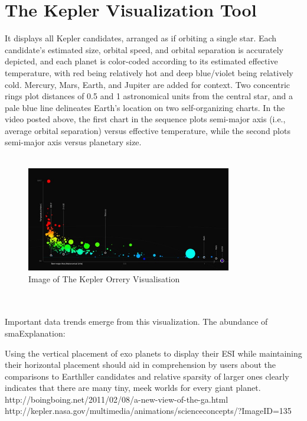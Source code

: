 \documentclass[11pt
              , a4paper
              , twoside
              , openright
              ]{report}
\begin{document}
\section{The Kepler Visualization Tool }
It displays all Kepler candidates, arranged as if orbiting a single star. Each candidate's estimated size, orbital speed, and orbital separation is accurately depicted, and each planet is color-coded according to its estimated effective temperature, with red being relatively hot and deep blue/violet being relatively cold. Mercury, Mars, Earth, and Jupiter are added for context. Two concentric rings plot distances of 0.5 and 1 astronomical units from the central star, and a pale blue line delineates Earth's location on two self-organizing charts. In the video posted above, the first chart in the sequence plots semi-major axis (i.e., average orbital separation) versus effective temperature, while the second plots semi-major axis versus planetary size.
\\\\
\begin{figure}[h!]
  \centering
      \includegraphics[width=0.8\textwidth]{images/kepler1.jpg}
  \caption{Image of The Kepler Orrery Visualisation}
\end{figure}
\\\\
Important data trends emerge from this visualization. The abundance of smaExplanation:

Using the vertical placement of exo planets to display their ESI while maintaining their horizontal placement should aid in comprehension by users about the comparisons to Earthller candidates and relative sparsity of larger ones clearly indicates that there are many tiny, meek worlds for every giant planet.
http://boingboing.net/2011/02/08/a-new-view-of-the-ga.html
http://kepler.nasa.gov/multimedia/animations/scienceconcepts/?ImageID=135
\end{document}
